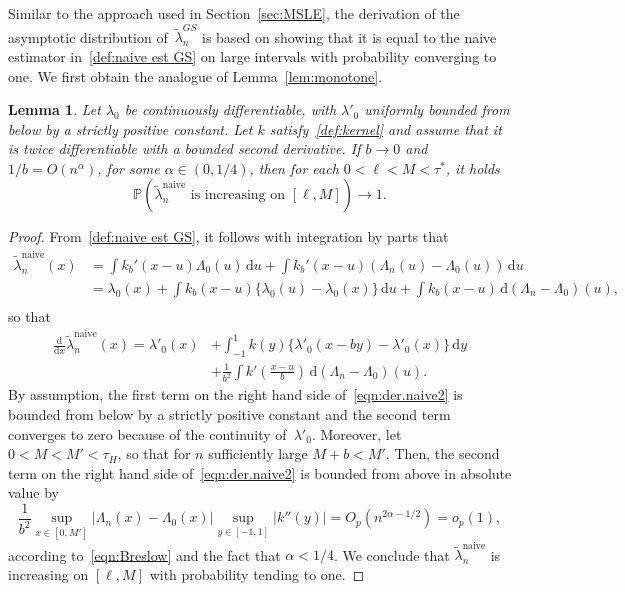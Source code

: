 \documentclass[11pt,reqno]{amsart}
\theoremstyle{definition}
\theoremstyle{plain}
\newtheorem{lemma}[de]{Lemma}
\theoremstyle{remark}
\begin{document}
Similar to the approach used in Section~\ref{sec:MSLE}, the derivation of the asymptotic distribution
of~$\tilde{\lambda}^{GS}_n$ is based on showing that it is equal to the naive estimator in~\eqref{def:naive est GS}
on large intervals with probability converging to one.
We first obtain the analogue of Lemma~\ref{lem:monotone}.
\begin{lemma}
\label{lem:monotone2}
Let $\lambda_0$ be continuously differentiable, with $\lambda'_0$ uniformly bounded from below by a strictly positive constant.
Let $k$ satisfy~\eqref{def:kernel} and assume that it is twice differentiable with a bounded second derivative.
If $b\to0$ and $1/b=O(n^{\alpha})$, for some $\alpha\in(0,1/4)$, then for each $0<\ell<M<\tau^*$,  it holds
\[
{\mathbb{P}}
\left(
\tilde{\lambda}_n^{\mathrm{naive}}\text{ is increasing on } [\ell,M]
\right)\to 1.
\]
\end{lemma}
\begin{proof}
From~\eqref{def:naive est GS}, it follows with integration by parts that
\begin{equation}
\label{eq:decomp naive GS}
\begin{split}
\tilde{\lambda}_n^{\mathrm{naive}}(x)
&=
\int k_b'(x-u)\Lambda_0(u)\,\mathrm{d}u
+
\int k_b'(x-u)
\left(
\Lambda_n(u)-\Lambda_0(u)
\right)\,\mathrm{d}u\\
&=
\lambda_0(x)+\int k_b(x-u)
\big\{
\lambda_0(u)-\lambda_0(x)
\big\}\,\mathrm{d}u
+
\int k_b(x-u)
\,\mathrm{d}\left(\Lambda_n-\Lambda_0\right)(u),\\
\end{split}
\end{equation}
so that
\begin{equation}
\label{eqn:der.naive2}
\begin{split}
\frac{\mathrm{d}}{\mathrm{d}x}\tilde{\lambda}_n^{\mathrm{naive}}(x)
=
\lambda'_0(x)
&+
\int_{-1}^1 k(y)
\big\{
\lambda'_0(x-by)-\lambda'_0(x)
\big\}\,\mathrm{d}y\\
&+
\frac{1}{b^2}\int k'\left(\frac{x-u}{b}\right)\,\mathrm{d}\left(\Lambda_n-\Lambda_0\right)(u).
\end{split}
\end{equation}
By assumption, the first term on the right hand side of~\eqref{eqn:der.naive2} is
bounded from below by a strictly positive constant and the second term converges to zero because of the continuity of~$\lambda'_0$.
Moreover, let $0<M<M'<\tau_H$, so that for $n$ sufficiently large $M+b<M'$.
Then, the second term on the right hand side of~\eqref{eqn:der.naive2} is bounded from above in absolute value by
\[
\frac{1}{b^2}\sup_{x\in[0,M']}\left|\Lambda_n(x)-\Lambda_0(x)\right|
\sup_{y\in[-1,1]}|k''(y)|
=
O_p(n^{2\alpha-1/2})=o_p(1),
\]
according to~\eqref{eqn:Breslow} and the fact that $\alpha<1/4$.
We conclude that $\tilde{\lambda}_n^{\mathrm{naive}}$ is increasing on $[\ell,M]$ with probability tending to one.
\end{proof}
\end{document}
